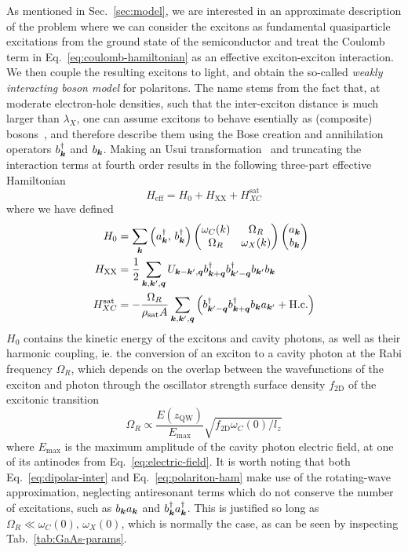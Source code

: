 As mentioned in Sec.~\ref{sec:model}, we are interested in an
approximate description of the problem where we can consider the
excitons as fundamental quasiparticle excitations from the ground
state of the semiconductor and treat the Coulomb term in
Eq.~\eqref{eq:coulomb-hamiltonian} as an effective exciton-exciton
interaction. We then couple the resulting excitons to light, and
obtain the so-called \textit{weakly interacting boson model} for
polaritons. The name stems from the fact that, at moderate
electron-hole densities, such that the inter-exciton distance is much
larger than $\lambda_X$, one can assume excitons to behave esentially
as (composite) bosons~\cite{deveaud2003electron}, and therefore
describe them using the Bose creation and annihilation operators
$b_{\bm{k}}^{\dagger}$ and $b_{\bm{k}}$. Making an Usui
transformation~\cite{Usui1960} and truncating the interaction terms at
fourth order results in the following three-part effective
Hamiltonian~\cite{Ciuti_2003}
%
\begin{equation}\label{eq:total-ham}
  H_{\text{eff}} = H_0  + H_{\text{XX}} + H_{XC}^{\text{sat}}
\end{equation}
% 
where we have defined
\begin{align}
  H_0 & =\sum_{\bm{k}}\left(a_{\bm{k}}^{\dagger},\, b_{\bm{k}}^{\dagger}\right)\begin{pmatrix} \omega_C(k) & \Omega_R\\ \Omega_R & \omega_X(k) \end{pmatrix}\begin{pmatrix} a_{\bm{k}}\\ b_{\bm{k}} \end{pmatrix}\label{eq:polariton-ham}\\
  H_{\text{XX}} & =\frac{1}{2}\sum_{\bm{k},\bm{k}^{\prime},\bm{q}}U_{\bm{k} - \bm{k}^{\prime},\bm{q}}b_{\bm{k} + \bm{q}}^{\dagger}b_{\bm{k}^{\prime} - \bm{q}}^{\dagger}b_{\bm{k}^{\prime}}b_{\bm{k}}\label{eq:interaction-ham}\\
  H_{XC}^{\text{sat}} & =-\frac{\Omega_R}{\rho_{\text{sat}}A}\sum_{\bm{k},\bm{k}^{\prime},\bm{q}}\left(b_{\bm{k}^{\prime}-\bm{q}}^{\dagger}b_{\bm{k} + \bm{q}}^{\dagger}b_{\bm{k}}a_{\bm{k}^{\prime}} + \text{H.c.}\right)\label{eq:saturation-ham}
\end{align}
$H_0$ contains the kinetic energy of the excitons and cavity photons,
as well as their harmonic coupling, ie. the conversion of an exciton
to a cavity photon at the Rabi frequency $\Omega_R$, which depends on
the overlap between the wavefunctions of the exciton and photon
through the  oscillator strength surface density $f_{\text{2D}}$ of
the excitonic transition
%
\begin{equation}\label{eq:omega-R}
  \Omega_R \propto \frac{E(z_{\text{QW}})}{E_{\text{max}}}\sqrt{f_{\text{2D}}\omega_C(0)/l_z}
\end{equation}
% 
where $E_{\text{max}}$ is the maximum amplitude of the cavity photon
electric field, at one of its antinodes from
Eq.~\eqref{eq:electric-field}. It is worth noting that both
Eq.~\eqref{eq:dipolar-inter} and Eq.~\eqref{eq:polariton-ham} make use
of the rotating-wave approximation, neglecting antiresonant terms
which do not conserve the number of excitations, such as
$b_{\bm{k}}a_{\bm{k}}$ and $b_{\bm{k}}^{\dagger}a_{\bm{k}}^{\dagger}$. This is
justified so long as $\Omega_R \ll \omega_C(0),\, \omega_X(0)$, which
is normally the case, as can be seen by inspecting
Tab.~\ref{tab:GaAs-params}.

